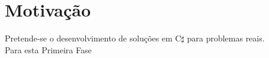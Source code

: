 \section{Motivação}
Pretende-se o desenvolvimento de soluções em C$\sharp$ para problemas reais.\\
Para esta Primeira Fase